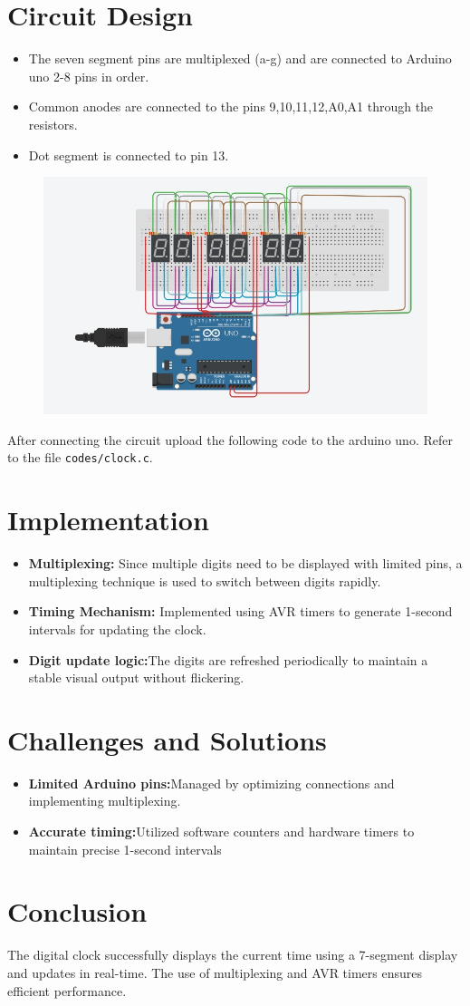 \documentclass[journal]{IEEEtran}
\begin{document}
 \section*{\textbf{Circuit Design}}
 \begin{itemize}
     \item The seven segment pins are multiplexed (a-g) and are connected to Arduino uno 2-8 pins in order.
     \item Common anodes are connected to the pins 9,10,11,12,A0,A1 through the resistors.
     \item Dot segment is connected to pin 13.
 \end{itemize}
 \begin{figure}[H]
     \centering
     \includegraphics[width=0.8\linewidth]{figs/clockcircuit.jpeg}
 \end{figure}
 After connecting the circuit upload the following code to the arduino uno.
 Refer to the file \texttt{codes/clock.c}.
 \section*{\textbf{Implementation}}
 \begin{itemize}
     \item \textbf{Multiplexing:} Since multiple digits need to be displayed with limited pins, a multiplexing technique is used to switch between digits rapidly.
     \item \textbf{Timing Mechanism:} Implemented using AVR timers to generate 1-second intervals for updating the clock.
    \item \textbf{Digit update logic:}The digits are refreshed periodically to maintain a stable visual output without flickering.
 \end{itemize}
\section*{\textbf{Challenges and Solutions}}
\begin{itemize}
    \item \textbf{Limited Arduino pins:}Managed by optimizing connections and implementing multiplexing.
    \item \textbf{Accurate timing:}Utilized software counters and hardware timers to maintain precise 1-second intervals
\end{itemize}
\section*{\textbf{Conclusion}}
The digital clock successfully displays the current time using a 7-segment display and updates in real-time. The use of multiplexing and AVR timers ensures efficient performance. 
\end{document}
